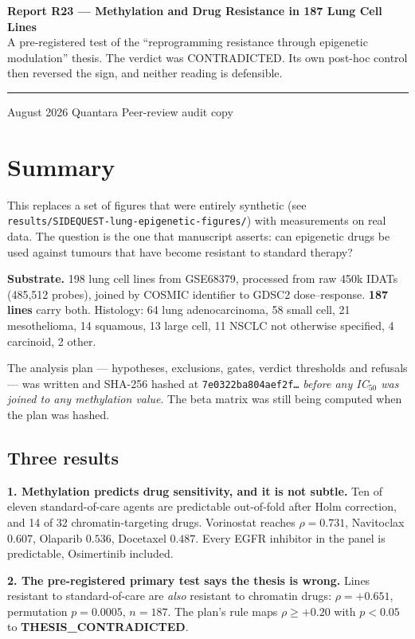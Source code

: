 \documentclass[11pt,a4paper]{article}
\begin{document}
\thispagestyle{empty}
\noindent
{\large\bfseries\color{qnavy} Report R23 --- Methylation and Drug Resistance in 187 Lung Cell
Lines}\\[2pt]
{\color{qgrey}A pre-registered test of the ``reprogramming resistance through epigenetic
modulation'' thesis. The verdict was CONTRADICTED. Its own post-hoc control then reversed the
sign, and neither reading is defensible.}\\[6pt]
{\color{qgrey}\rule{\textwidth}{0.4pt}}

\medskip
{} August 2026 \quad\textbullet\quad Quantara \quad\textbullet\quad
{\color{qgrey}Peer-review audit copy}

\section*{Summary}

This replaces a set of figures that were entirely synthetic (see
\texttt{results/SIDEQUEST-lung-epigenetic-figures/}) with measurements on real data. The question
is the one that manuscript asserts: can epigenetic drugs be used against tumours that have become
resistant to standard therapy?

\textbf{Substrate.} 198 lung cell lines from GSE68379, processed from raw 450k IDATs
(485{,}512 probes), joined by COSMIC identifier to GDSC2 dose--response. \textbf{187 lines}
carry both. Histology: 64 lung adenocarcinoma, 58 small cell, 21 mesothelioma, 14 squamous,
13 large cell, 11 NSCLC not otherwise specified, 4 carcinoid, 2 other.

The analysis plan --- hypotheses, exclusions, gates, verdict thresholds and refusals --- was written
and SHA-256 hashed at \texttt{7e0322ba804aef2f\ldots} \emph{before any IC$_{50}$ was joined to any
methylation value}. The beta matrix was still being computed when the plan was hashed.

\subsection*{Three results}

\textbf{1. Methylation predicts drug sensitivity, and it is not subtle.} Ten of eleven
standard-of-care agents are predictable out-of-fold after Holm correction, and 14 of 32
chromatin-targeting drugs. Vorinostat reaches $\rho = 0.731$, Navitoclax $0.607$, Olaparib $0.536$,
Docetaxel $0.487$. Every EGFR inhibitor in the panel is predictable, Osimertinib included.

\textbf{2. The pre-registered primary test says the thesis is wrong.} Lines resistant to
standard-of-care are \emph{also} resistant to chromatin drugs: $\rho = +0.651$, permutation
$p = 0.0005$, $n = 187$. The plan's rule maps $\rho \geq +0.20$ with $p<0.05$ to
\textbf{THESIS\_CONTRADICTED}.
\end{document}
